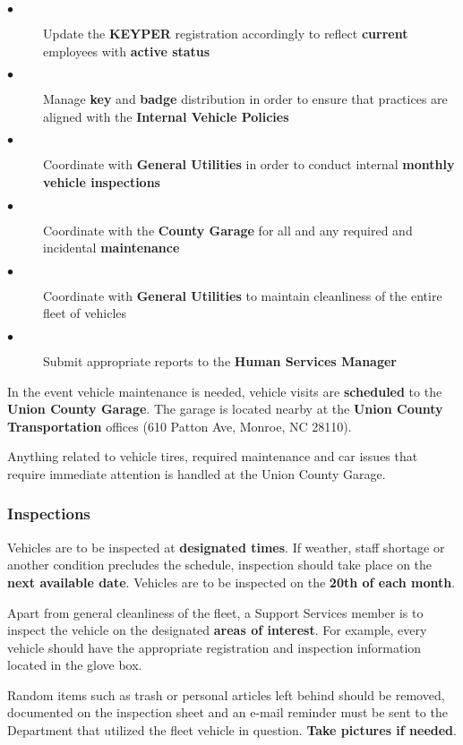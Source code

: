 \documentclass{article}
\begin{document}
\begin{description}
    \item[$\bullet$] Update the \textbf{KEYPER} registration accordingly to reflect \textbf{current} employees with \textbf{active status}
    \item[$\bullet$] Manage \textbf{key} and \textbf{badge} distribution in order to ensure that practices are aligned with the \textbf{Internal Vehicle Policies}
    \item[$\bullet$] Coordinate with \textbf{General Utilities} in order to conduct internal \textbf{monthly vehicle inspections}
    \item[$\bullet$] Coordinate with the \textbf{County Garage} for all and any required and incidental \textbf{maintenance}
    \item[$\bullet$] Coordinate with \textbf{General Utilities }to maintain cleanliness of the entire fleet of vehicles
    \item[$\bullet$] Submit appropriate reports to the \textbf{Human Services Manager}
\end{description}

In the event vehicle maintenance is needed, vehicle visits are \textbf{scheduled} to the \textbf{Union County Garage}. The garage is located nearby at the \textbf{Union County Transportation} offices (610 Patton Ave, Monroe, NC 28110).

Anything related to vehicle tires, required maintenance and car issues that require immediate attention is handled at the Union County Garage.


\subsubsection{Inspections}
Vehicles are to be inspected at \textbf{designated times}. If weather, staff shortage or another condition precludes the schedule, inspection should take place on the \textbf{next available date}. Vehicles are to be inspected on the \textbf{20th of each month}.

Apart from general cleanliness of the fleet, a Support Services member is to inspect the vehicle on the designated \textbf{areas of interest}. For example, every vehicle should have the appropriate registration and inspection information located in the glove box.

Random items such as trash or personal articles left behind should be removed, documented on the inspection sheet and an e-mail reminder must be sent to the Department that utilized the fleet vehicle in question. \textbf{Take pictures if needed}.
\end{document}
